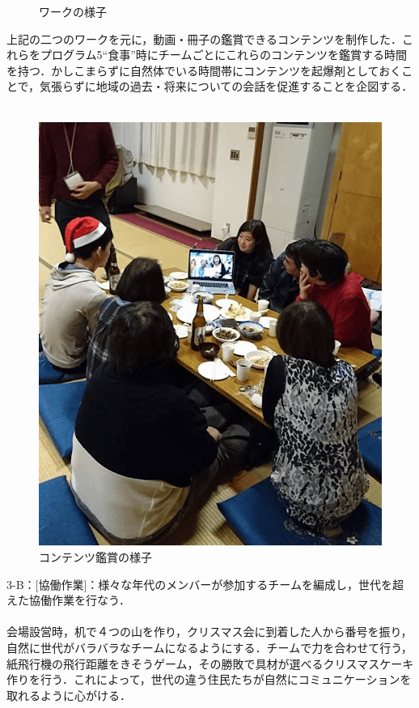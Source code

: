 \documentclass[a4paper]{jsarticle}
\begin{document}
\begin{itemize}
\begin{figure}[H]
\begin{center}
\begin{tabular}{cc}
  \end{tabular}
    \caption{ワークの様子}
    \label{fig:tmu_hino_yokonarabi}
  \end{center}
\end{figure}


上記の二つのワークを元に，動画・冊子の鑑賞できるコンテンツを制作した．これらをプログラム5“食事”時にチームごとにこれらのコンテンツを鑑賞する時間を持つ．かしこまらずに自然体でいる時間帯にコンテンツを起爆剤としておくことで，気張らずに地域の過去・将来についての会話を促進することを企図する．\\\\
\begin{figure}[H]
  \begin{center}
    \includegraphics[width=0.6\hsize]{./images/09.png}
    \caption{コンテンツ鑑賞の様子}
    \label{fig:tmu_hino}
  \end{center}
\end{figure}

\end{itemize}
3-B：[協働作業]：様々な年代のメンバーが参加するチームを編成し，世代を超えた協働作業を行なう．\\\\
会場設営時，机で４つの山を作り，クリスマス会に到着した人から番号を振り，自然に世代がバラバラなチームになるようにする．チームで力を合わせて行う，紙飛行機の飛行距離をきそうゲーム，その勝敗で具材が選べるクリスマスケーキ作りを行う．これによって，世代の違う住民たちが自然にコミュニケーションを取れるように心がける．\\\\
\end{document}
